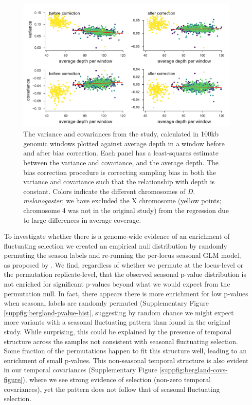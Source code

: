 \documentclass[11pt]{article}
\begin{document}
\begin{figure}[!ht]
  \centering
  \includegraphics[]{figures/bergland-correction-plot.pdf}

  \caption{The variance and covariances from the \textcite{Bergland2014-ij}
    study, calculated in 100kb genomic windows plotted against average depth in
    a window before and after bias correction. Each panel has a least-squares
    estimate between the variance and covariance, and the average depth.
    The bias correction procedure is correcting sampling bias in both the variance
    and covariance such that the relationship with depth is constant. Colors
    indicate the different chromosomes of \emph{D. melanogaster}; we have
    excluded the X chromosome (yellow points; chromosome 4 was not in the
    original study) from the regression due to large differences in average
    coverage.}

  \label{suppfig:bergland-correction}
\end{figure}



To investigate whether there is a genome-wide evidence of an enrichment of
fluctuating selection we created an empirical null distribution by randomly
permuting the season labels and re-running the per-locus seasonal GLM model, as
proposed by \textcite{Machado2018-cs}. We find, regardless of whether we
permute at the locus-level or the permutation replicate-level, that the
observed seasonal p-value distribution \textcite{Bergland2014-ij} is not
enriched for significant p-values beyond what we would expect from the
permutation null. In fact, there appears there is more enrichment for low
p-values when seasonal labels are randomly permuted (Supplementary Figure
\ref{suppfig:bergland-pvalue-hist}, suggesting by random chance we might expect
more variants with a seasonal fluctuating pattern than found in the original
\textcite{Bergland2014-ij} study. While surprising, this could be explained by
the presence of temporal structure across the samples not consistent with
seasonal fluctuating selection. Some fraction of the permutations happen to fit
this structure well, leading to an enrichment of small p-values. This
non-seasonal temporal structure is also evident in our temporal covariances
(Supplementary Figure \ref{suppfig:bergland-covs-figure}), where we see strong
evidence of selection (non-zero temporal covariances), yet the pattern does not
follow that of seasonal fluctuating selection.  
\end{document}
